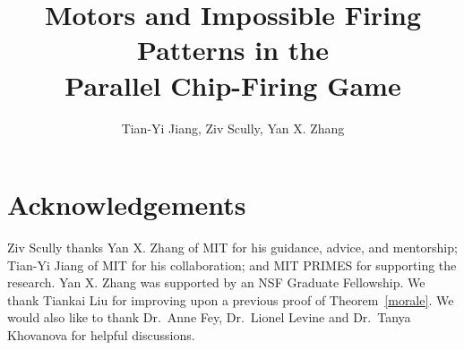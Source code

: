 \documentclass[11pt]{amsart}
\newlength{\figWidthA}
\newlength{\figWidthB}
\numberwithin{equation}{section}
\begin{document}
\setlength{}
\setlength{}

\title[Motors and Impossible Firing Patterns in the PCFG]{Motors and Impossible
  Firing Patterns in the\\Parallel Chip-Firing Game}
\author{Tian-Yi Jiang, Ziv Scully, Yan X. Zhang}
\address{Massachusetts Institute of Technology}
\begin{abstract}

\end{abstract}
\maketitle















%

\section*{Acknowledgements}
Ziv Scully thanks Yan X. Zhang of MIT for his guidance, advice, and mentorship;
Tian-Yi Jiang of MIT for his collaboration; and MIT PRIMES for supporting the
research. Yan X. Zhang was supported by an NSF Graduate Fellowship. We thank
Tiankai Liu for improving upon a previous proof of Theorem~\ref{morale}. We
would also like to thank Dr.~Anne Fey, Dr.~Lionel Levine and Dr.~Tanya
Khovanova for helpful discussions.



\end{document}
